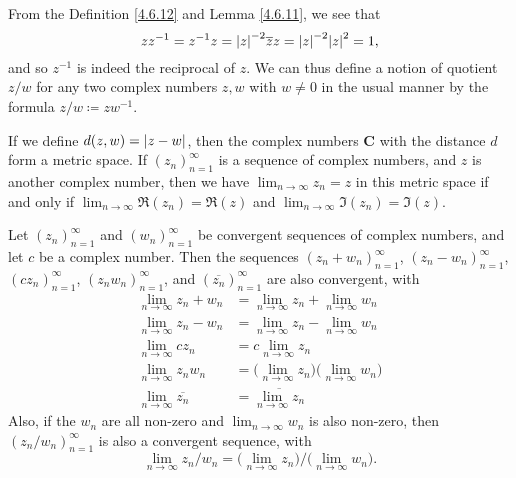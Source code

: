 \begin{note}
    From the Definition \ref{4.6.12} and Lemma \ref{4.6.11}, we see that
    \[
        z z^{-1} = z^{-1} z = \abs*{z}^{-2} \overline{z} z = \abs*{z}^{-2} \abs*{z}^2 = 1,
    \]
    and so \(z^{-1}\) is indeed the reciprocal of \(z\).
    We can thus define a notion of quotient \(z / w\) for any two complex numbers \(z, w\) with \(w \neq 0\) in the usual manner by the formula \(z / w \coloneqq z w^{-1}\).
\end{note}

\begin{lemma}\label{4.6.13}
    If we define \(d(z, w) = \abs*{z - w}\), then the complex numbers \(\mathbf{C}\) with the distance \(d\) form a metric space.
    If \((z_n)_{n = 1}^\infty\) is a sequence of complex numbers, and \(z\) is another complex number, then we have \(\lim_{n \to \infty} z_n = z\) in this metric space if and only if \(\lim_{n \to \infty} \Re(z_n) = \Re(z)\) and \(\lim_{n \to \infty} \Im(z_n) = \Im(z)\).
\end{lemma}

\begin{lemma}\label{4.6.14}
    Let \((z_n)_{n = 1}^\infty\) and \((w_n)_{n = 1}^\infty\) be convergent sequences of complex numbers, and let \(c\) be a complex number.
    Then the sequences \((z_n + w_n)_{n = 1}^\infty\), \((z_n - w_n)_{n = 1}^\infty\), \((c z_n)_{n = 1}^\infty\), \((z_n w_n)_{n = 1}^\infty\), and \((\overline{z_n})_{n = 1}^\infty\) are also convergent, with
    \begin{align*}
        \lim_{n \to \infty} z_n + w_n      & = \lim_{n \to \infty} z_n + \lim_{n \to \infty} w_n                       \\
        \lim_{n \to \infty} z_n - w_n      & = \lim_{n \to \infty} z_n - \lim_{n \to \infty} w_n                       \\
        \lim_{n \to \infty} c z_n          & = c \lim_{n \to \infty} z_n                                               \\
        \lim_{n \to \infty} z_n w_n        & = \bigg(\lim_{n \to \infty} z_n\bigg) \bigg(\lim_{n \to \infty} w_n\bigg) \\
        \lim_{n \to \infty} \overline{z_n} & = \overline{\lim_{n \to \infty} z_n}
    \end{align*}
    Also, if the \(w_n\) are all non-zero and \(\lim_{n \to \infty} w_n\) is also non-zero, then \((z_n / w_n)_{n = 1}^\infty\) is also a convergent sequence, with
    \[
        \lim_{n \to \infty} z_n / w_n = \bigg(\lim_{n \to \infty} z_n\bigg) / \bigg(\lim_{n \to \infty} w_n\bigg).
    \]
\end{lemma}

